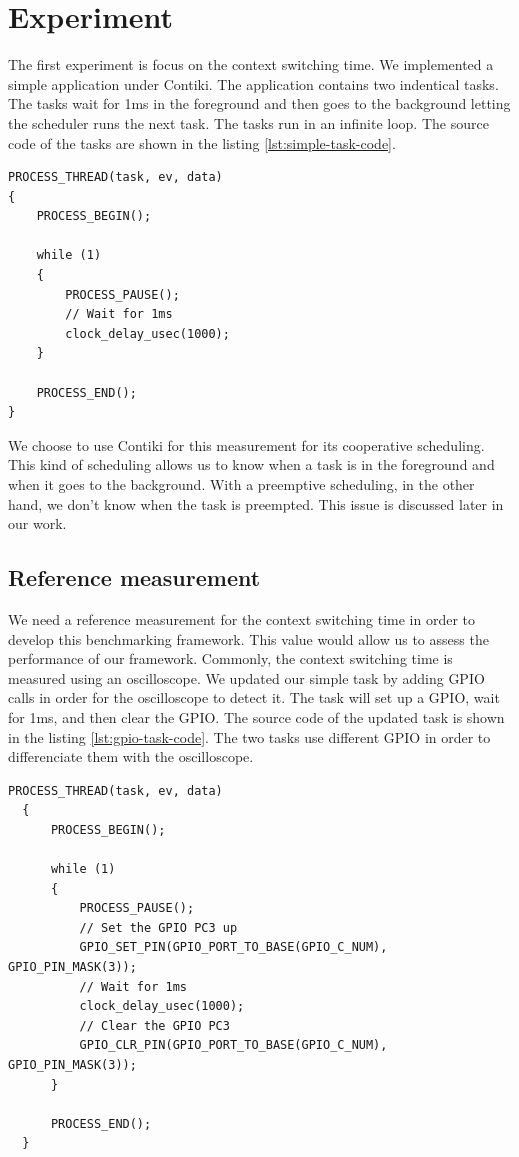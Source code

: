 \section{Experiment}

The first experiment is focus on the context switching time.
We implemented a simple application under Contiki.
The application contains two indentical tasks.
The tasks wait for 1ms in the foreground and then goes to the background letting the scheduler runs the next task.
The tasks run in an infinite loop.
The source code of the tasks are shown in the listing \ref{lst:simple-task-code}.

\begin{lstlisting}[style=CStyle, label={lst:simple-task-code}, caption={Source code of the simple task implemented in Contiki}]
PROCESS_THREAD(task, ev, data)
{
    PROCESS_BEGIN();

    while (1)
    {
        PROCESS_PAUSE();
        // Wait for 1ms
        clock_delay_usec(1000);
    }

    PROCESS_END();
}
\end{lstlisting}


We choose to use Contiki for this measurement for its cooperative scheduling.
This kind of scheduling allows us to know when a task is in the foreground and when it goes to the background.
With a preemptive scheduling, in the other hand, we don't know when the task is preempted.
This issue is discussed later in our work.

\subsection{Reference measurement}

We need a reference measurement for the context switching time in order to develop this benchmarking framework.
This value would allow us to assess the performance of our framework.
Commonly, the context switching time is measured using an oscilloscope.
We updated our simple task by adding GPIO calls in order for the oscilloscope to detect it.
The task will set up a GPIO, wait for 1ms, and then clear the GPIO.
The source code of the updated task is shown in the listing \ref{lst:gpio-task-code}.
The two tasks use different GPIO in order to differenciate them with the oscilloscope.

\begin{lstlisting}[style=CStyle, label={lst:gpio-task-code}, caption={Source code of the task with GPIO calls}]
  PROCESS_THREAD(task, ev, data)
  {
      PROCESS_BEGIN();
  
      while (1)
      {
          PROCESS_PAUSE();
          // Set the GPIO PC3 up
          GPIO_SET_PIN(GPIO_PORT_TO_BASE(GPIO_C_NUM), GPIO_PIN_MASK(3));
          // Wait for 1ms
          clock_delay_usec(1000);
          // Clear the GPIO PC3
          GPIO_CLR_PIN(GPIO_PORT_TO_BASE(GPIO_C_NUM), GPIO_PIN_MASK(3));
      }
  
      PROCESS_END();
  }
\end{lstlisting}

